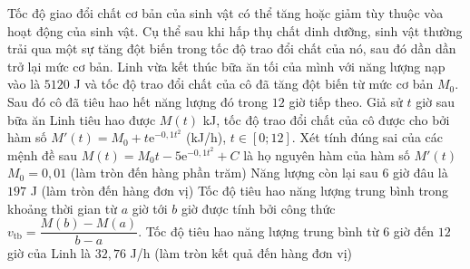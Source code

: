 \begin{ex}%
	Tốc độ giao đổi chất cơ bản của sinh vật có thể tăng hoặc giảm tùy thuộc vòa hoạt động của sinh vật. Cụ thể sau khi hấp thụ chất dinh dưỡng, sinh vật thường trải qua một sự tăng đột biến trong tốc độ trao đổi chất của nó, sau đó dần dần trở lại mức cơ bản. Linh vừa kết thúc bữa ăn tối của mình với năng lượng nạp vào là $5120$ J và tốc độ trao đổi chất của cô đã tăng đột biến từ mức cơ bản $M_0$. Sau đó cô đã tiêu hao hết năng lượng đó trong $12$ giờ tiếp theo. Giả sử $t$ giờ sau bữa ăn Linh tiêu hao được $M(t)$ kJ, tốc độ trao đổi chất của cô được cho bởi hàm số $M'(t)=M_0+t\mathrm{e}^{-0{,}1t^2}$ (kJ/h), $t\in[0;12]$. Xét tính đúng sai của các mệnh đề sau
	\choiceTF
	{\True $M(t)=M_0t-5\mathrm{e}^{-0{,}1t^2}+C$ là họ nguyên hàm của hàm số $M'(t)$}
	{\True $M_0=0{,}01$ (làm tròn đến hàng phần trăm)}
	{\True Năng lượng còn lại sau $6$ giờ đâu là $197$ J (làm tròn đến hàng đơn vị)}
	{Tốc độ tiêu hao năng lượng trung bình trong khoảng thời gian từ $a$ giờ tới $b$ giờ được tính bởi công thức $v_{\text{tb}}=\dfrac{M(b)-M(a)}{b-a}$. Tốc độ tiêu hao năng lượng trung bình từ $6$ giờ đến $12$ giờ của Linh là $32{,}76$ J/h (làm tròn kết quả đến hàng đơn vị)}
\end{ex}
